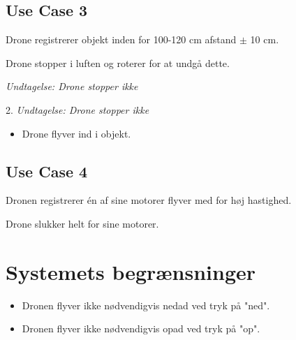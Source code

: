 \documentclass[Main]{subfiles}
\begin{document}
\subsection{Use Case 3}
\begin{UseCase}

	\begin{normFor}
	\item Drone registrerer objekt inden for 100-120 cm afstand $\pm$ 10 cm.
	\item Drone stopper i luften og roterer for at undgå dette.
	\item[] \textit{Undtagelse: Drone stopper ikke}
	\end{normFor} 

	\begin{normFor}
	\item[2.] \textit{Undtagelse: Drone stopper ikke}
		\begin{itemize}
		\item Drone flyver ind i objekt.
		\end{itemize}
	\end{normFor} 
	
\end{UseCase}

\newpage
\subsection{Use Case 4}
\begin{UseCase}

	\begin{normFor}
	\item Dronen registrerer én af sine motorer flyver med for høj hastighed.
	\item Drone slukker helt for sine motorer.
	\end{normFor} 
\end{UseCase}


\section{Systemets begrænsninger}
\begin{itemize}
\item Dronen flyver ikke nødvendigvis nedad ved tryk på "ned".
\item Dronen flyver ikke nødvendigvis opad ved tryk på "op".
\end{itemize}
\end{document}

